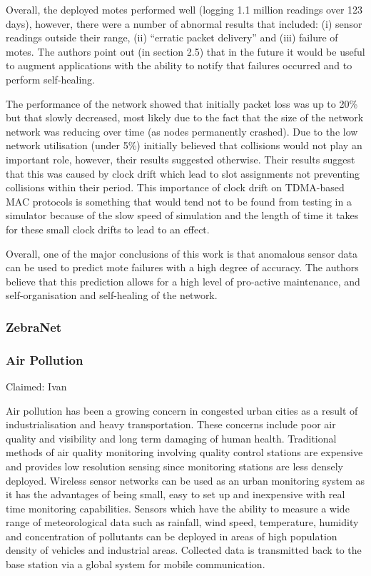 Overall, the deployed motes performed well (logging 1.1 million readings over 123 days), however, there were a number of abnormal results that included: (i) sensor readings outside their range, (ii) ``erratic packet delivery'' and (iii) failure of motes. The authors point out (in section 2.5) that in the future it would be useful to augment applications with the ability to notify that failures occurred and to perform self-healing.

The performance of the network showed that initially packet loss was up to 20\% but that slowly decreased, most likely due to the fact that the size of the network network was reducing over time (as nodes permanently crashed). Due to the low network utilisation (under 5\%) \citeauthor{SzewczykPMC04} initially believed that collisions would not play an important role, however, their results suggested otherwise. Their results suggest that this was caused by clock drift which lead to slot assignments not preventing collisions within their period. This importance of clock drift on TDMA-based MAC protocols is something that would tend not to be found from testing in a simulator because of the slow speed of simulation and the length of time it takes for these small clock drifts to lead to an effect.

Overall, one of the major conclusions of this work is that anomalous sensor data can be used to predict mote failures with a high degree of accuracy. The authors believe that this prediction allows for a high level of pro-active maintenance, and self-organisation and self-healing of the network.

\subsubsection*{ZebraNet}
\cite{Juang:2002:ECW:635508.605408}

\subsubsection*{Air Pollution}
\cite{libeliumAirPollution}
\cite{wsnpollution} 

\cite{fotuewsnpollution} Claimed: Ivan

Air pollution has been a growing concern in congested urban cities as a result of industrialisation and heavy transportation. These concerns include poor air quality and visibility and long term damaging of human health. Traditional methods of air quality monitoring involving quality control stations are expensive and provides low resolution sensing since monitoring stations are less densely deployed. Wireless sensor networks can be used as an urban monitoring system as it has the advantages of being small, easy to set up and inexpensive with real time monitoring capabilities. Sensors which have the ability to measure a wide range of meteorological data such as rainfall, wind speed, temperature, humidity and concentration of pollutants can be deployed in areas of high population density of vehicles and industrial areas. Collected data is transmitted back to the base station via a global system for mobile communication.

